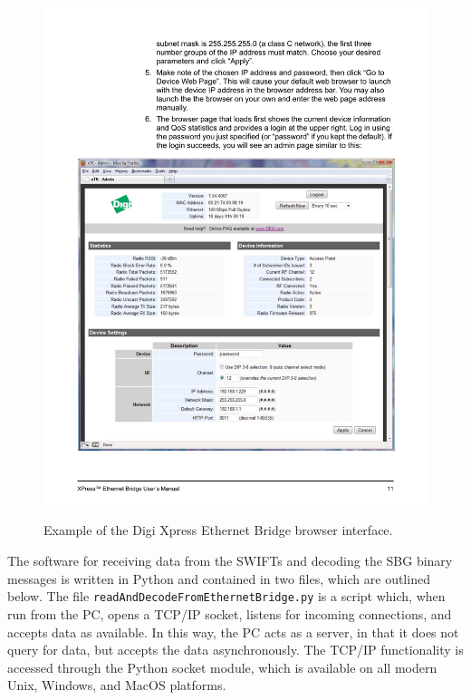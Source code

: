 \documentclass[11pt]{article}
\begin{document}
\begin{figure}[t]
    \centering
    \noindent\includegraphics[width=5.5in]{XpressBrowserInterface.pdf}\\
   \vspace{-0in}\caption{Example of the Digi Xpress Ethernet Bridge browser interface.}\label{fig:XpressBrowserInterface}
\end{figure}


The software for receiving data from the SWIFTs and decoding the SBG binary messages is written in Python and contained in two files, which are outlined below. The file \texttt{readAndDecodeFromEthernetBridge.py} is a script which, when run from the PC, opens a TCP/IP socket, listens for incoming connections, and accepts data as available.  In this way, the PC acts as a server, in that it does not query for data, but accepts the data asynchronously.  The TCP/IP functionality is accessed through the Python socket module, which is available on all modern Unix, Windows, and MacOS platforms.  
\end{document}
